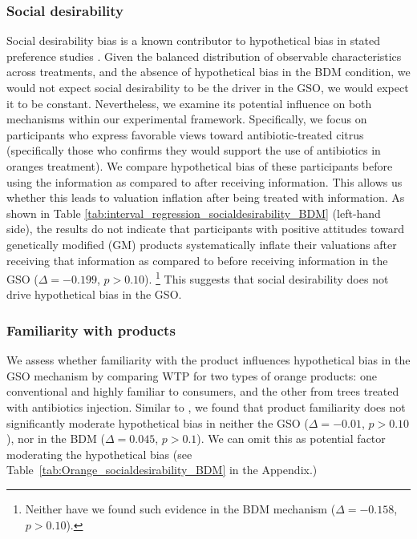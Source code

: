 \documentclass[12pt]{article}
\begin{document}
\subsubsection{Social desirability}
Social desirability bias is a known contributor to hypothetical bias in stated preference studies \citep{norwood2011social, entem2022using}. Given the balanced distribution of observable characteristics across treatments, and the absence of hypothetical bias in the BDM condition, we would not expect social desirability to be the driver in the GSO, we would expect it to be constant. Nevertheless, we examine its potential influence on both mechanisms within our experimental framework. Specifically, we focus on participants who express favorable views toward antibiotic-treated citrus (specifically those who confirms they would support the use of antibiotics in oranges treatment).  We compare hypothetical bias of these participants before using the information as compared to after receiving information. This allows us whether this leads to valuation inflation after being treated with information. As shown in Table \ref{tab:interval_regression_socialdesirability_BDM} (left-hand side), the results do not indicate that participants with positive attitudes toward genetically modified (GM) products systematically inflate their valuations after receiving that information as compared to before receiving information in the GSO (\(\Delta = -0.199\), \(p > 0.10\)). \footnote{Neither have we found such evidence in the BDM mechanism (\(\Delta = -0.158\), \(p > 0.10\)).} This suggests that social desirability does not drive hypothetical bias in the GSO.

\subsubsection{Familiarity with products}
We assess whether familiarity with the product influences hypothetical bias in the GSO mechanism by comparing WTP for two types of orange products: one conventional and highly familiar to consumers, and the other from trees treated with antibiotics injection. Similar to \citet{veettil_hypothetical_2024},  we found that product familiarity does not significantly moderate hypothetical bias in neither the GSO (\(\Delta = -0.01\), \(p > 0.10\)), nor in the BDM (\(\Delta = 0.045\), \(p >0.1\)). We can omit this as potential factor moderating the hypothetical bias (see Table~\ref{tab:Orange_socialdesirability_BDM} in the Appendix.)
\end{document}
